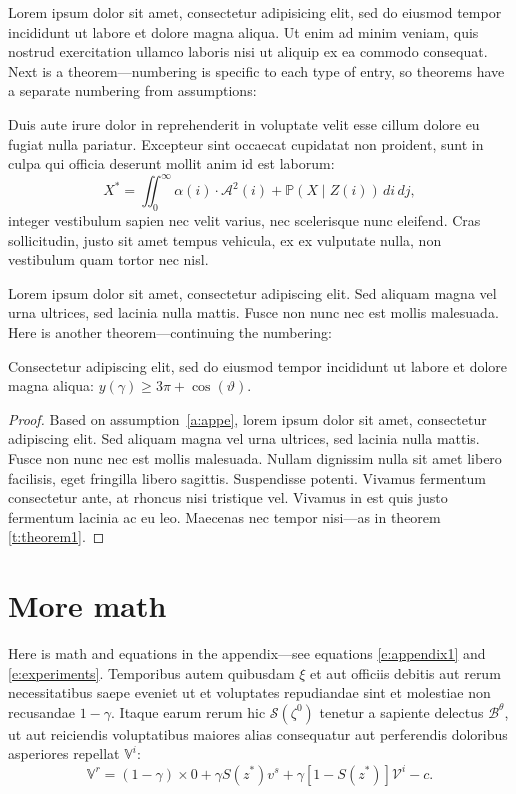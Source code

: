Lorem ipsum dolor sit amet, consectetur adipisicing elit, sed do eiusmod
tempor incididunt ut labore et dolore magna aliqua. Ut enim ad minim veniam,
quis nostrud exercitation ullamco laboris nisi ut aliquip ex ea commodo
consequat. Next is a theorem---numbering is specific to each type of entry, so theorems have a separate numbering from assumptions:
\begin{theorem}
Duis aute irure dolor in reprehenderit in voluptate velit esse
cillum dolore eu fugiat nulla pariatur. Excepteur sint occaecat cupidatat non
proident, sunt in culpa qui officia deserunt mollit anim id est laborum:
\begin{equation}
X^* =\iint_{0}^{\infty} \alpha(i) \cdot \mathcal{A}^2(i) + \mathbb{P}(X\mid Z(i))\,di\,dj,\end{equation}
integer vestibulum sapien nec velit varius, nec scelerisque nunc eleifend. Cras sollicitudin, justo sit amet tempus vehicula, ex ex vulputate nulla, non vestibulum quam tortor nec nisl. 
\end{theorem}

Lorem ipsum dolor sit amet, consectetur adipiscing elit. Sed aliquam magna vel urna ultrices, sed lacinia nulla mattis. Fusce non nunc nec est mollis malesuada. Here is another theorem---continuing the numbering:
\begin{theorem}
Consectetur adipiscing elit, sed do eiusmod tempor incididunt ut labore et dolore magna aliqua: $y(\gamma) \geq 3\pi + \cos(\vartheta)$.
\label{t:theorem1}\end{theorem}

\begin{proof}
Based on assumption~\ref{a:appe}, lorem ipsum dolor sit amet, consectetur adipiscing elit. Sed aliquam magna vel urna ultrices, sed lacinia nulla mattis. Fusce non nunc nec est mollis malesuada. Nullam dignissim nulla sit amet libero facilisis, eget fringilla libero sagittis. Suspendisse potenti. Vivamus fermentum consectetur ante, at rhoncus nisi tristique vel. Vivamus in est quis justo fermentum lacinia ac eu leo. Maecenas nec tempor nisi---as in theorem \ref{t:theorem1}.
\end{proof}

\section{More math}

Here is math and equations in the appendix---see equations \eqref{e:appendix1} and \eqref{e:experiments}. Temporibus autem quibusdam $\xi$ et aut officiis debitis aut rerum necessitatibus saepe eveniet ut et voluptates repudiandae sint et molestiae non recusandae $1-\gamma$. Itaque earum rerum hic $\mathcal{S}(\zeta^0)$ tenetur a sapiente delectus $\mathcal{B}^\theta$, ut aut reiciendis voluptatibus maiores alias consequatur aut perferendis doloribus asperiores repellat $\mathbb{V}^i$:
\begin{equation}
\mathbb{V}^r = (1-\gamma) \times 0 +\gamma S(z^*) v^s+\gamma [1-S(z^*)] \mathcal{V}^i-c.
\label{e:appendix1}\end{equation}

